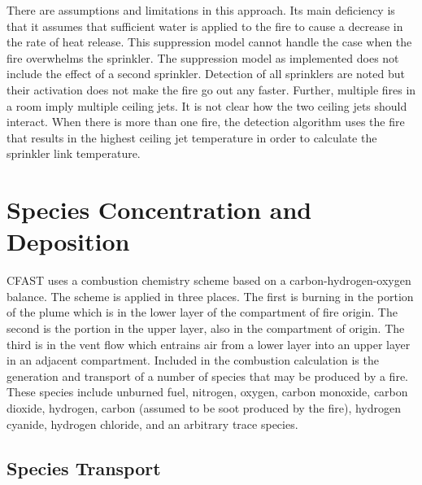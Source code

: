 There are assumptions and limitations in this approach. Its main deficiency is that it assumes that sufficient water is applied to the fire to cause a decrease in the rate of heat release. This suppression model cannot handle the case when the fire overwhelms the sprinkler.  The suppression model as implemented does not include the effect of a second sprinkler. Detection of all sprinklers are noted but their activation does not make the fire go out any faster. Further, multiple fires in a room imply multiple ceiling jets. It is not clear how the two ceiling jets should interact. When there is more than one fire, the detection algorithm uses the fire that results in the highest ceiling jet temperature in order to calculate the sprinkler link temperature.

\section{Species Concentration and Deposition}

CFAST uses a combustion chemistry scheme based on a carbon-hydrogen-oxygen balance.  The scheme is applied in three places.  The first is burning in the portion of the plume which is in the lower layer of the compartment of fire origin.  The second is the portion in the upper layer, also in the compartment of origin.  The third is in the vent flow which entrains air from a lower layer into an upper layer in an adjacent compartment.  Included in the combustion calculation is the generation and transport of a number of species that may be produced by a fire.  These species include unburned fuel, nitrogen, oxygen, carbon monoxide, carbon dioxide, hydrogen, carbon (assumed to be soot produced by the fire), hydrogen cyanide, hydrogen chloride, and an arbitrary trace species.

\subsection{Species Transport}

